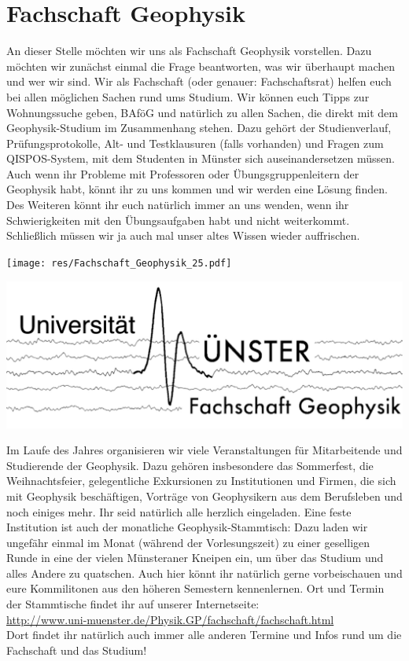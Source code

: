 \section{Fachschaft Geophysik}
\begin{multicols*}{2}
An dieser Stelle möchten wir uns als Fachschaft Geophysik vorstellen.
Dazu möchten wir zunächst einmal die Frage beantworten, was wir überhaupt machen und wer wir sind.
Wir als Fachschaft (oder genauer: Fachschaftsrat) helfen euch bei allen möglichen Sachen rund ums Studium.
Wir können euch Tipps zur Wohnungssuche geben, BAföG und natürlich zu allen Sachen, die direkt mit dem Geophysik-Studium im Zusammenhang stehen.
Dazu gehört der Studienverlauf, Prüfungsprotokolle, Alt- und Testklausuren (falls vorhanden) und Fragen zum QISPOS-System, mit dem Studenten in Münster sich auseinandersetzen müssen.
Auch wenn ihr Probleme mit Professoren oder Übungsgruppenleitern der Geophysik habt, könnt ihr zu uns kommen und wir werden eine Lösung finden.
Des Weiteren könnt ihr euch natürlich immer an uns wenden, wenn ihr Schwierigkeiten mit den Übungsaufgaben habt und nicht weiterkommt.
Schließlich müssen wir ja auch mal unser altes Wissen wieder auffrischen.

\begin{center}
	\texttt{[image: res/Fachschaft\_Geophysik\_25.pdf]}
	
	\includegraphics[width=0.8\columnwidth]{res/fs_geophysik_logo_neu.jpg}
\end{center}

Im Laufe des Jahres organisieren wir viele Veranstaltungen für Mitarbeitende und Studierende der Geophysik.
Dazu gehören insbesondere das Sommerfest, die Weihnachtsfeier, gelegentliche Exkursionen zu Institutionen und Firmen, die sich mit Geophysik beschäftigen, Vorträge von Geophysikern aus dem Berufsleben und noch einiges mehr.
Ihr seid natürlich alle herzlich eingeladen.
Eine feste Institution ist auch der monatliche Geophysik-Stammtisch:
Dazu laden wir ungefähr einmal im Monat (während der Vorlesungszeit) zu einer geselligen Runde in eine der vielen Münsteraner Kneipen ein, um über das Studium und alles Andere zu quatschen.
Auch hier könnt ihr natürlich gerne vorbeischauen und eure Kommilitonen aus den höheren Semestern kennenlernen.
Ort und Termin der Stammtische findet ihr auf unserer Internetseite:\\
\url{http://www.uni-muenster.de/Physik.GP/fachschaft/fachschaft.html}\\
Dort findet ihr natürlich auch immer alle anderen Termine und Infos rund um die Fachschaft und das Studium!


\end{multicols*}
